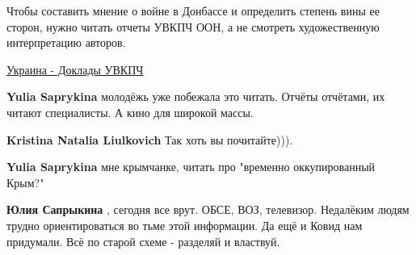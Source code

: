 \begin{itemize}
 

Чтобы составить мнение о войне в Донбассе и определить степень вины ее сторон,
нужно читать отчеты УВКПЧ ООН, а не смотреть художественную интерпретацию
авторов.

\href{https://www.ohchr.org/ru/Countries/ENACARegion/Pages/UAReports.aspx}{%
Украина - Доклады УВКПЧ%
}

\begin{itemize}
 
\textbf{Yulia Saprykina} молодёжь уже побежала это читать. Отчёты отчётами, их читают специалисты. А кино для широкой массы.

 
\textbf{Kristina Natalia Liulkovich} Так хоть вы почитайте))).

 
\textbf{Yulia Saprykina} мне крымчанке, читать про "временно оккупированный Крым?" \Smiley[1.0][yellow]

 
\textbf{Юлия Сапрыкина} , сегодня все врут. ОБСЕ, ВОЗ, телевизор. Недалёким
людям трудно ориентироваться во тьме этой информации. Да ещё и Ковид нам
придумали. Всё по старой схеме - разделяй и властвуй.


\end{itemize}
\end{itemize}
